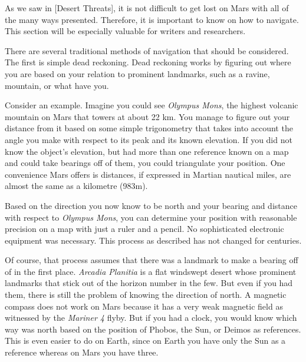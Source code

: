 

As we saw in [Desert Threats], it is not difficult to get lost on Mars with all of the many ways presented. Therefore, it is important to know on how to navigate. This section will be especially valuable for writers and researchers.

There are several traditional methods of navigation that should be considered. The first is simple dead reckoning. Dead reckoning works by figuring out where you are based on your relation to prominent landmarks, such as a ravine, mountain, or what have you. 

Consider an example. Imagine you could see {\it Olympus Mons}, the highest volcanic mountain on Mars that towers at about 22 km. You manage to figure out your distance from it based on some simple trigonometry that takes into account the angle you make with respect to its peak and its known elevation. If you did not know the object's elevation, but had more than one reference known on a map and could take bearings off of them, you could triangulate your position. One convenience Mars offers is distances, if expressed in Martian nautical miles, are almost the same as a kilometre (983m).

Based on the direction you now know to be north and your bearing and distance with respect to {\it Olympus Mons}, you can determine your position with reasonable precision on a map with just a ruler and a pencil. No sophisticated electronic equipment was necessary. This process as described has not changed for centuries.

Of course, that process assumes that there was a landmark to make a bearing off of in the first place. {\it Arcadia Planitia} is a flat windswept desert whose prominent landmarks that stick out of the horizon number in the few. But even if you had them, there is still the problem of knowing the direction of north. A magnetic compass does not work on Mars because it has a very weak magnetic field as witnessed by the {\it Mariner 4} flyby. But if you had a clock, you would know which way was north based on the position of Phobos, the Sun, or Deimos as references. This is even easier to do on Earth, since on Earth you have only the Sun as a reference whereas on Mars you have three.

